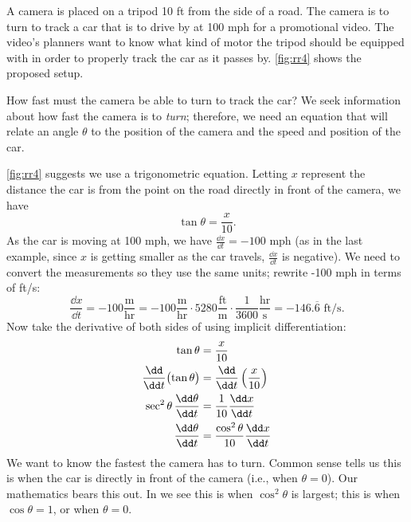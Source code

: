 \begin{example}\label{ex_rr4}
A camera is placed on a tripod 10 ft from the side of a road. The camera is to turn to track a car that is to drive by at 100 mph for a promotional video. The video's planners want to know what kind of motor the tripod should be equipped with in order to properly track the car as it passes by.  \autoref{fig:rr4} shows the proposed setup.


How fast must the camera be able to turn to track the car?
\solution
We seek information about how fast the camera is to \emph{turn}; therefore, we need an equation that will relate an angle $\theta$ to the position of the camera and the speed and position of the car.

\autoref{fig:rr4} suggests we use a trigonometric equation. Letting $x$ represent the distance the car is from the point on the road directly in front of the camera, we have
\begin{equation}\tan \theta = \frac{x}{10}.\label{eq:rr4}\end{equation}
As the car is moving at 100 mph, we have $\frac{\dd x}{\dd t} = -100$ mph (as in the last example, since $x$ is getting smaller as the car travels, $\frac{\dd x}{\dd t}$ is negative). We need to convert the measurements so they use the same units; rewrite -100 mph in terms of ft/s:
\[
\frac{\dd x}{\dd t} = -100\frac{\text{m}}{\text{hr}} = -100\frac{\text{m}}{\text{hr}}\cdot5280\frac{\text{ft}}{\text{m}}\cdot\frac{1}{3600}\frac{\text{hr}}{\text{s}} =-146.\overline{6}\text{ ft/s}.
\]
Now take the derivative of both sides of  using implicit differentiation:
\begin{align}
	\tan \theta &= \frac{x}{10} \notag \\
	\frac{\dd}{\dd t}\bigl(\tan \theta\bigr)
	&= \frac{\dd}{\dd t}\left(\frac{x}{10}\right)\notag \\
	\sec^2\theta\,\frac{\dd\theta}{\dd t} &= \frac{1}{10}\frac{\dd x}{\dd t}\notag\\
	\frac{\dd\theta}{\dd t} &= \frac{\cos^2\theta}{10}\frac{\dd x}{\dd t}\label{eq:rr4b}
\end{align}
We want to know the fastest the camera has to turn. Common sense tells us this is when the car is directly in front of the camera (i.e., when $\theta = 0$). Our mathematics bears this out. In  we see this is when $\cos^2\theta$ is largest; this is when $\cos \theta = 1$, or when $\theta = 0$.


\end{example}
